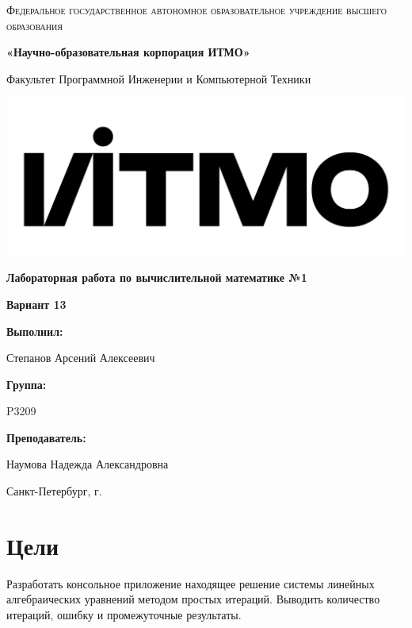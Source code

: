 \documentclass[12pt,a4paper]{report}
\begin{document}
\begin{titlepage} 
	\centering
	{
        \scshape
        Федеральное государственное автономное образовательное учреждение высшего образования
        \par
        \textbf{«Научно-образовательная корпорация ИТМО»}
        \par
        \vspace*{1cm}
        Факультет Программной Инженерии и Компьютерной Техники
        \par
    }
    \vspace*{0.6cm}
    \includegraphics[width=\textwidth]{logo.png}
    {
        \Large
        \textbf{Лабораторная работа по вычислительной математике №1}
        \par
        \normalsize
        \vspace*{0.75cm}
        \textbf{Вариант 13}
        \par
    }
    \vfill
    \hfill\begin{minipage}{\dimexpr\textwidth-7.8cm}
        \textbf{Выполнил:}\par
        Степанов Арсений Алексеевич\par
        \vspace*{0.15cm}
        \textbf{Группа:}\par
        P3209\par
        \vspace*{0.15cm}
        \textbf{Преподаватель:}\par
        Наумова Надежда Александровна\par
    \end{minipage}
    \vfill
    Санкт-Петербург, \the\year{}г.
\end{titlepage}  
\section*{Цели}
Разработать консольное приложение находящее решение системы линейных алгебраических уравнений методом простых итераций. Выводить количество итераций, ошибку и промежуточные результаты.
\end{document}
